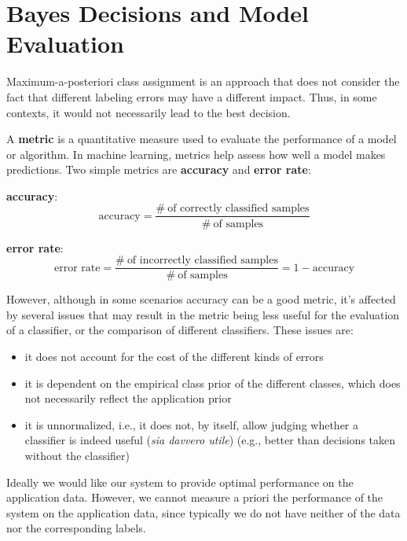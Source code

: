 \setlength{\parindent}{0pt}  %
\setlength{\parskip}{0.7em}  %

\section*{Bayes Decisions and Model Evaluation}

Maximum-a-posteriori class assignment is an approach that does not consider the fact that different labeling errors may have a different impact. Thus, in some contexts, it would not necessarily lead to the best decision.

A \textbf{metric} is a quantitative measure used to evaluate the performance of a model or algorithm. In machine learning, metrics help assess how well a model makes predictions.
Two simple metrics are \textbf{accuracy} and \textbf{error rate}:

\textbf{accuracy}:
\begin{equation*}
\text{accuracy} = \frac{\#\ \text{of correctly classified samples}}{\#\ \text{of samples}}
\end{equation*}

\textbf{error rate}:
\begin{equation*}
\text{error rate} = \frac{\#\ \text{of incorrectly classified samples}}{\#\ \text{of samples}} = 1 - \text{accuracy}
\end{equation*}

However, although in some scenarios accuracy can be a good metric, it's affected by several issues that may result in the metric being less useful for the evaluation of a classifier, or the comparison of different classifiers. These issues are:

\begin{itemize}
  \item it does not account for the cost of the different kinds of errors
  \item it is dependent on the empirical class prior of the different classes, which does not necessarily reflect the application prior
  \item it is unnormalized, i.e., it does not, by itself, allow judging whether a classifier is indeed useful (\textit{sia davvero utile}) (e.g., better than decisions taken without the classifier)
\end{itemize}

Ideally we would like our system to provide optimal performance on the application data. However, we cannot measure a priori the performance of the system on the application data, since typically we do not have neither of the data nor the corresponding labels.

